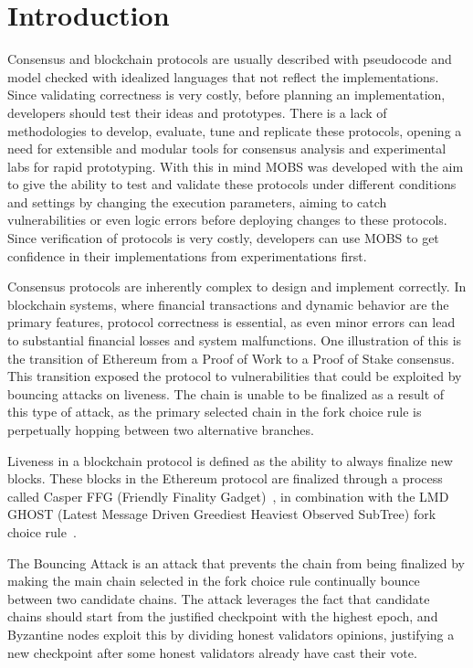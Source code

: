 \documentclass[11pt,a4paper]{article}
\begin{document}
\section{Introduction}

Consensus and blockchain protocols are usually described with pseudocode and model checked with idealized languages that 
not reflect the implementations. Since validating correctness is very costly, before planning an
implementation, developers should test their ideas and prototypes. There is a lack of methodologies to develop,
evaluate, tune and replicate these protocols, opening a need for extensible and modular tools for consensus analysis and
experimental labs for rapid prototyping.
With this in mind MOBS was developed with the aim to give the ability to test and validate these protocols under different conditions and settings by 
changing the execution parameters, aiming to catch vulnerabilities or even logic errors before deploying changes to these protocols.
Since verification of protocols is very costly, developers can use MOBS to get confidence in their implementations
from experimentations first.

Consensus protocols are inherently complex to design and implement correctly.
In blockchain systems, where financial transactions and dynamic behavior are the primary features, protocol correctness is essential,
as even minor errors can lead to substantial financial losses and system malfunctions. One illustration of this is the transition of
Ethereum from a Proof of Work to a Proof of Stake consensus. This transition exposed the protocol to vulnerabilities that could be
exploited by bouncing attacks on liveness.
The chain is unable to be finalized as a result of this type of attack, as the primary selected chain in the fork
choice rule is perpetually hopping between two alternative branches.

Liveness in a blockchain protocol is defined as the ability to always finalize new blocks. These blocks in the
Ethereum protocol are finalized through a process called Casper FFG (Friendly Finality Gadget)~\cite{casper_ffg}, in combination with
the LMD GHOST (Latest Message Driven Greediest Heaviest Observed SubTree) fork choice rule~\cite{ghost_casper}.

The Bouncing Attack is an attack that prevents the chain from being finalized by making the main chain
selected in the fork choice rule continually bounce between two candidate chains. The attack leverages the fact that
candidate chains should start from the justified checkpoint with the highest epoch, and Byzantine nodes exploit this by
dividing honest validators opinions, justifying a new checkpoint after some honest validators already have cast their vote.
\end{document}
